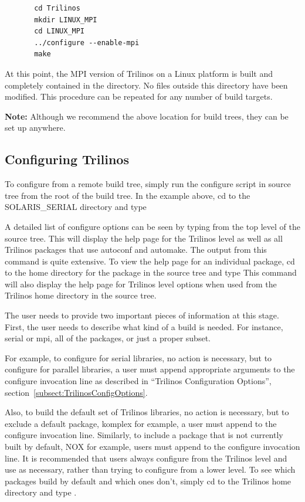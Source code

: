 \documentclass[12pt,relax]{TrilinosDevGuide}
\begin{document}
\begin{verbatim}
       cd Trilinos
       mkdir LINUX_MPI
       cd LINUX_MPI
       ../configure --enable-mpi
       make
\end{verbatim}
At this point, the MPI version of Trilinos on a Linux platform is
built and completely contained in the 
directory.  No files outside this directory have been modified.  This
procedure can be repeated for any number of build targets.

{\bf Note:} Although we recommend the above location for build trees,
they can be set up anywhere.

\subsection{Configuring Trilinos}
\label{Subsection:ConfiguringTrilinos}
	To configure from a remote build tree, simply run the configure script 
in source tree from the root of the build tree.  In the example above, cd to 
the SOLARIS\_SERIAL directory and type 

A detailed list of configure options can be seen by typing
 from the top level of the 
source tree.  This will display the help page for the Trilinos level as well as all 
Trilinos packages that use autoconf and automake.  The output from this command
is quite extensive.  To view the help page for an individual package, cd to 
the home directory for the package in the source tree and type 
This command will also display the help page for Trilinos level 
options when used from the Trilinos home directory in the source tree.


	The user needs to provide two important pieces of information at this 
stage.  First, the user needs to describe what kind of a build is needed.  For 
instance, serial or mpi, all of the packages, or just a proper subset.  

	For example, to configure for serial libraries, no action is necessary,
but to configure for parallel libraries, a user must append appropriate 
arguments to the configure invocation line as described in ``Trilinos 
Configuration Options'', section~\ref{subsect:TrilinosConfigOptions}.

	Also, to build the default set of Trilinos libraries, no action is 
necessary, but to exclude a default package, komplex for example, a user must 
append  to the configure invocation  line.  
Similarly, to include a package that is not currently built by default, NOX 
for example, users must append  to the configure 
invocation line.  It is recommended that users always configure from the 
Trilinos level and use  as necessary, 
rather than trying to configure from a lower level.  To see which packages 
build by default and which ones don't, simply cd to the Trilinos home 
directory and type .
\end{document}
